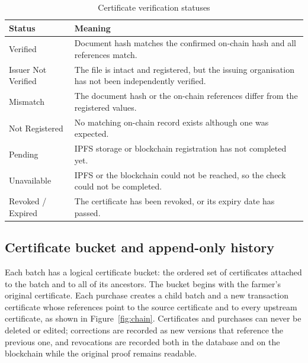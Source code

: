 \begin{table}[!ht]
	\caption{Certificate verification statuses}
	\label{tab:status}
	\centering
	\small
	\begin{tabular}{|L{3.4cm}|L{11.6cm}|}
		\hline
		\textbf{Status} & \textbf{Meaning} \\ \hline
		Verified & Document hash matches the confirmed on-chain hash and all references match. \\ \hline
		Issuer Not Verified & The file is intact and registered, but the issuing organisation has not been independently verified. \\ \hline
		Mismatch & The document hash or the on-chain references differ from the registered values. \\ \hline
		Not Registered & No matching on-chain record exists although one was expected. \\ \hline
		Pending & IPFS storage or blockchain registration has not completed yet. \\ \hline
		Unavailable & IPFS or the blockchain could not be reached, so the check could not be completed. \\ \hline
		Revoked / Expired & The certificate has been revoked, or its expiry date has passed. \\ \hline
	\end{tabular}
\end{table}

\subsection*{Certificate bucket and append-only history}
Each batch has a logical certificate bucket: the ordered set of certificates attached to the batch and to all of its ancestors. The bucket begins with the farmer's original certificate. Each purchase creates a child batch and a new transaction certificate whose references point to the source certificate and to every upstream certificate, as shown in Figure~\ref{fig:chain}. Certificates and purchases can never be deleted or edited; corrections are recorded as new versions that reference the previous one, and revocations are recorded both in the database and on the blockchain while the original proof remains readable.

